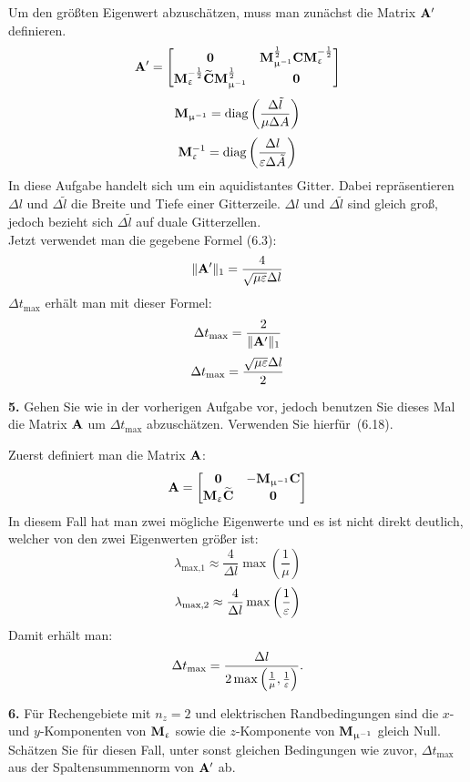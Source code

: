 \documentclass[Protokollheft.tex]{subfiles}
\begin{document}
Um den größten Eigenwert abzuschätzen, muss man zunächst die Matrix $ \mathbf{A} '$ definieren.
$$ \mathbf{A} '=\begin{bmatrix}
\boldsymbol{0} & \mathbf{M}_{\upmu^{-1}}^{\frac12}\mathbf{C}\mathbf{M}_{\upvarepsilon}^{-\frac12}\\
\mathbf{M}_{\upvarepsilon}^{-\frac12}\widetilde{\mathbf{C}} \mathbf{M}_{\upmu^{-1}}^{\frac12} & \boldsymbol{0}
\end{bmatrix} $$
$$\mathbf{M}_{\upmu^{-1}} = \text{diag}\left(\frac{\Delta\tilde{l}}{\mu\Delta A}\right) $$
$$\mathbf{M}_{\upvarepsilon}^{-1} = \text{diag}\left(\frac{\Delta l}{\varepsilon\Delta \tilde{A}}\right) $$
\noindent
In diese Aufgabe handelt sich um ein aquidistantes Gitter. Dabei repräsentieren $\Delta l$ und  $\Delta \tilde{l}$ die Breite und Tiefe einer Gitterzeile. $\Delta l$ und  $\Delta \tilde{l}$ sind gleich groß, jedoch bezieht sich $\Delta \tilde{l}$ auf duale Gitterzellen.\\
Jetzt verwendet man die gegebene Formel (6.3):
$$\| \mathbf{A} '\|_1 = \frac{4}{\sqrt{\mu\varepsilon}\Delta l}$$
$\Delta t_{\text{max}}$ erhält man mit dieser Formel:
$$ \Delta t_{\text{max}}=\frac{2}{\| \mathbf{A} '\|_1}$$
$$ \Delta t_{\text{max}}=\frac{\sqrt{\mu\varepsilon}\Delta l}{2}$$


\begin{framed}
	\noindent \textbf{5.} Gehen Sie wie in der vorherigen Aufgabe vor, jedoch benutzen Sie
    dieses Mal die Matrix $ \mathbf{A} $ um $\Delta t_{\text{max}}$ abzuschätzen. Verwenden Sie hierfür~(6.18).\label{exer:approxEVofA}
\end{framed}
\noindent
Zuerst definiert man die Matrix $ \mathbf{A} $:
$$ \mathbf{A} =\begin{bmatrix}
\boldsymbol{0} & -\mathbf{M}_{\upmu^{-1}}\mathbf{C}\\
\mathbf{M}_{\upvarepsilon}\widetilde{\mathbf{C}} & \boldsymbol{0}
\end{bmatrix} $$
\noindent
In diesem Fall hat man zwei mögliche Eigenwerte und es ist nicht direkt deutlich, welcher von den zwei Eigenwerten größer ist:
$$\lambda_{\text{max,1}} \approx \frac{4}{\Delta l}\max\left(\frac{1}{\mu}\right) $$
$$\lambda_{\text{max,2}} \approx \frac{4}{\Delta l}\max\left(\frac{1}{\varepsilon}\right) $$
\noindent
Damit erhält man:
$$\Delta t_{\text{max}}=\frac{\Delta l}{2\max\left(\frac{1}{\mu},\frac{1}{\varepsilon}\right)}.$$




\begin{framed}
	\noindent \textbf{6.} Für Rechengebiete mit $n_z=2$ und elektrischen
    Randbedingungen sind die $x$- und $y$-Komponenten von $\mathbf{M}_{\upvarepsilon}$ sowie die
    $z$-Komponente von $\mathbf{M}_{\upmu^{-1}}$ gleich Null. Schätzen Sie für diesen Fall,
    unter sonst gleichen Bedingungen wie zuvor, $\Delta t_{\text{max}}$ aus
    der Spaltensummennorm von $ \mathbf{A} '$ ab.\label{exer:approxDeltaTmax}
\end{framed}
\end{document}
